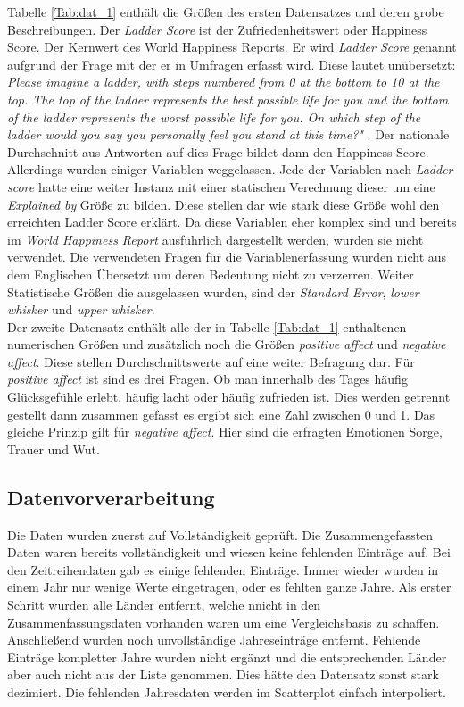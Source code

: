 Tabelle \ref{Tab:dat_1} enthält die Größen des ersten Datensatzes und deren grobe Beschreibungen. Der \textit{Ladder Score} ist der Zufriedenheitswert oder Happiness Score. Der Kernwert des World Happiness Reports. Er wird \textit{Ladder Score} genannt aufgrund der Frage mit der er in Umfragen erfasst wird. Diese lautet unübersetzt: \textit{Please imagine a ladder, with steps numbered from 0 at the
bottom to 10 at the top. The top of the ladder represents the best possible life
for you and the bottom of the ladder represents the worst possible life for you.
On which step of the ladder would you say you personally feel you stand at this
time?"} \cite{helliwell_world_2021}. Der nationale Durchschnitt aus Antworten auf dies Frage bildet dann den Happiness Score. \\

Allerdings wurden einiger Variablen weggelassen. Jede der Variablen nach \textit{Ladder score} hatte eine weiter Instanz mit einer statischen Verechnung dieser um eine \textit{Explained by} Größe zu bilden. Diese stellen dar wie stark diese Größe wohl den erreichten Ladder Score erklärt. Da diese Variablen eher komplex sind und bereits im \textit{World Happiness Report}  ausführlich dargestellt werden, wurden sie nicht verwendet. Die verwendeten Fragen für die Variablenerfassung wurden nicht aus dem Englischen Übersetzt um deren Bedeutung nicht zu verzerren. Weiter Statistische Größen die ausgelassen wurden, sind der \textit{Standard Error}, \textit{lower whisker} und \textit{upper whisker}. \\

Der zweite Datensatz enthält alle der in Tabelle \ref{Tab:dat_1} enthaltenen numerischen Größen und zusätzlich noch die Größen \textit{positive affect} und \textit{negative affect}. Diese stellen Durchschnittswerte auf eine weiter Befragung dar. Für \textit{positive affect} ist sind es drei Fragen. Ob man innerhalb des Tages häufig Glücksgefühle erlebt, häufig lacht oder häufig zufrieden ist. Dies werden getrennt gestellt dann zusammen gefasst es ergibt sich eine Zahl zwischen 0 und 1. Das gleiche Prinzip gilt für \textit{negative affect}. Hier sind die erfragten Emotionen Sorge, Trauer und Wut. 

\subsection{Datenvorverarbeitung}

Die Daten wurden zuerst auf Vollständigkeit geprüft. Die Zusammengefassten Daten waren bereits vollständigkeit und wiesen keine fehlenden Einträge auf. Bei den Zeitreihendaten gab es einige fehlenden Einträge. Immer wieder wurden in einem Jahr nur wenige Werte eingetragen, oder es fehlten ganze Jahre. Als erster Schritt wurden alle Länder entfernt, welche nnicht in den Zusammenfassungsdaten vorhanden waren um eine Vergleichsbasis zu schaffen. Anschließend wurden noch unvollständige Jahreseinträge entfernt. Fehlende Einträge kompletter Jahre wurden nicht ergänzt und die entsprechenden Länder aber auch nicht aus der Liste genommen. Dies hätte den Datensatz sonst stark dezimiert. Die fehlenden Jahresdaten werden im Scatterplot einfach interpoliert. 

